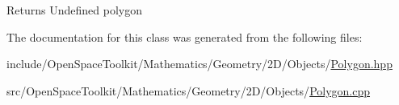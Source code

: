 \begin{DoxyReturn}{Returns}
Undefined polygon 
\end{DoxyReturn}


The documentation for this class was generated from the following files\+:\begin{DoxyCompactItemize}
\item 
include/\+Open\+Space\+Toolkit/\+Mathematics/\+Geometry/2\+D/\+Objects/\hyperlink{2_d_2_objects_2_polygon_8hpp}{Polygon.\+hpp}\item 
src/\+Open\+Space\+Toolkit/\+Mathematics/\+Geometry/2\+D/\+Objects/\hyperlink{2_d_2_objects_2_polygon_8cpp}{Polygon.\+cpp}\end{DoxyCompactItemize}
